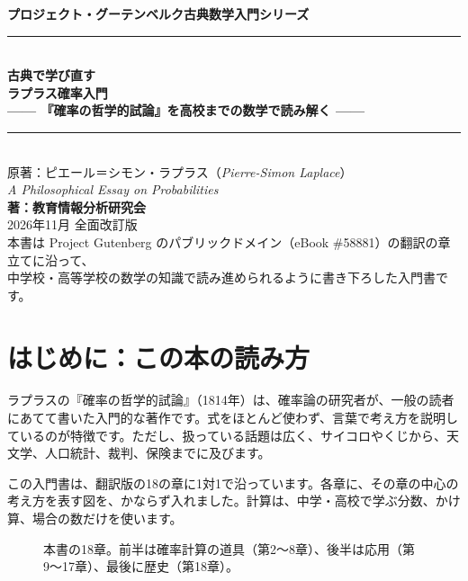 \documentclass[a4paper,11pt,openany]{ltjsbook}
\begin{document}
\begin{titlepage}
\begin{center}
\vspace*{1.5cm}
{\Large\bfseries プロジェクト・グーテンベルク古典数学入門シリーズ}\\[0.8cm]
\rule{\textwidth}{1.5pt}\\[0.4cm]
{\Huge\bfseries 古典で学び直す\\ラプラス確率入門}\\[0.4cm]
{\Large\bfseries —— 『確率の哲学的試論』を高校までの数学で読み解く ——}\\[0.4cm]
\rule{\textwidth}{1.5pt}\\[1.5cm]
{\large 原著：ピエール＝シモン・ラプラス（\textit{Pierre-Simon Laplace}）\\
\textit{A Philosophical Essay on Probabilities}}\\[2.0cm]
{\Large\bfseries 著：教育情報分析研究会}\\[2.5cm]
\vfill
{\large 2026年11月 全面改訂版}\\[0.5cm]
{\footnotesize 本書は Project Gutenberg のパブリックドメイン（eBook \#58881）の翻訳の章立てに沿って、\\
中学校・高等学校の数学の知識で読み進められるように書き下ろした入門書です。}
\end{center}
\end{titlepage}

\frontmatter
\tableofcontents
\mainmatter

\chapter*{はじめに：この本の読み方}

ラプラスの『確率の哲学的試論』（1814年）は、確率論の研究者が、一般の読者にあてて書いた入門的な著作です。式をほとんど使わず、言葉で考え方を説明しているのが特徴です。ただし、扱っている話題は広く、サイコロやくじから、天文学、人口統計、裁判、保険までに及びます。

この入門書は、翻訳版の18の章に1対1で沿っています。各章に、その章の中心の考え方を表す図を、かならず入れました。計算は、中学・高校で学ぶ分数、かけ算、場合の数だけを使います。

\begin{figure}[htbp]
\centering
{}
\caption{本書の18章。前半は確率計算の道具（第2〜8章）、後半は応用（第9〜17章）、最後に歴史（第18章）。}
\end{figure}
\end{document}
